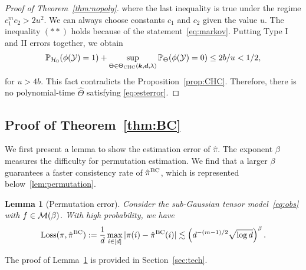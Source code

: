 \documentclass[12pt]{article}
\newtheorem{lem}{Lemma}
\theoremstyle{definition}
\begin{document}
{\begin{proof}[Proof of Theorem~\ref{thm:nopoly}]
where the last inequality is true under the regime $c_1^mc_2>2u^2$. We can always choose constants $c_1$ and $c_2$ given the value $u$. The inequality $(**)$ holds because of the statement~\eqref{eq:markov}. 
Putting Type I and II errors together, we obtain
\begin{align}
 \mathbb{P}_{\mathcal{H}_0}(\phi(\mathcal{Y}) = 1)+ \sup_{\Theta\in\Theta_{\text{CHC}}(\bm{k},\bm{d},\lambda)}\mathbb{P}_{\Theta}(\phi(\mathcal{Y}) =0) \leq 2b/u < 1/2,
\end{align}
for $u>4b$. This fact contradicts the Proposition~\ref{prop:CHC}.  Therefore, there is no polynomial-time $\hat\Theta$ satisfying \eqref{eq:esterror}.
\end{proof}
}



\subsection{Proof of Theorem~\ref{thm:BC}}
We first present a lemma to show the estimation error of $\hat \pi$. The exponent $\beta$ measures the difficulty for permutation estimation. We find that a larger $\beta$ guarantees a faster consistency rate of $\hat\pi^{\textup{BC}}$, which is represented below~\ref{lem:permutation}.

\begin{lem}[Permutation error]\label{lem:permute}
Consider the sub-Gaussian tensor model~\eqref{eq:obs} with $f\in \mathcal{M}(\beta)$. With high probability, we have
\begin{align}
    \textup{Loss}(\pi,\hat\pi^{\textup{BC}}):= \frac{1}{d}\max_{i\in[d]}|\pi(i)-\hat\pi^{\textup{BC}}(i)|\lesssim \left(d^{-(m-1)/2}\sqrt{\log d}\right)^{\beta}.
\end{align}
\end{lem}
The proof of Lemma~\ref{lem:permute} is provided in Section~\ref{sec:tech}. 
\end{document}
